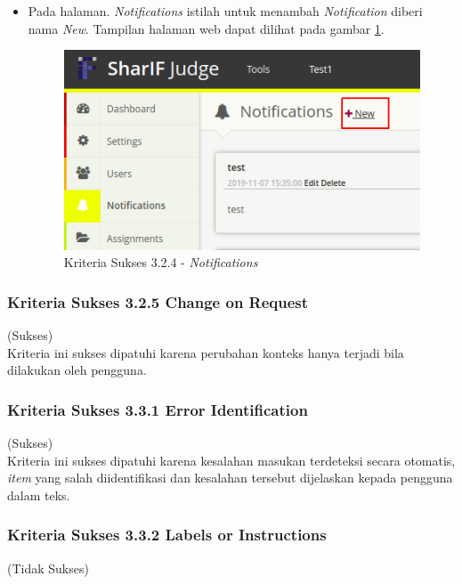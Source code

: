 \documentclass[a4paper,twoside]{article}
\begin{document}
\begin{enumerate}
\begin{itemize}
			\item Pada halaman. \textit{Notifications} istilah untuk menambah \textit{Notification} diberi nama \textit{New}. Tampilan halaman web dapat dilihat pada gambar \ref{fig:kepatuhan_3_2_4_notifications}.
			\begin{figure}[H]
				\centering  
				\includegraphics[scale=0.5]{kepatuhan_3_2_4_notifications}  
				\caption[Kriteria Sukses 3.2.4 - \textit{Notifications}]{Kriteria Sukses 3.2.4 - \textit{Notifications}} 
				\label{fig:kepatuhan_3_2_4_notifications} 
			\end{figure}
			
		\end{itemize}
		
		\subsubsection*{Kriteria Sukses 3.2.5 Change on Request}
		\label{subsubsec:kepatuhan_kriteria_3.2.5}
		(Sukses) \\
		
		Kriteria ini sukses dipatuhi karena perubahan konteks hanya terjadi bila dilakukan oleh pengguna.
		
		\subsubsection*{Kriteria Sukses 3.3.1 Error Identification}
		\label{subsubsec:kepatuhan_kriteria_3.3.1}
		(Sukses)\\
		
		Kriteria ini sukses dipatuhi karena kesalahan masukan terdeteksi secara otomatis, \textit{item} yang salah diidentifikasi dan kesalahan tersebut dijelaskan kepada pengguna dalam teks.
		
		\subsubsection*{Kriteria Sukses 3.3.2 Labels or Instructions}
		\label{subsubsec:kepatuhan_kriteria_3.3.2}
		(Tidak Sukses) \\
		

\end{enumerate}
\end{document}
